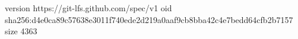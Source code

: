 version https://git-lfs.github.com/spec/v1
oid sha256:d4e0ca89c57638e3011f740ede2d219a0aaf9cb8bba42c4e7bedd64cfb2b7157
size 4363
